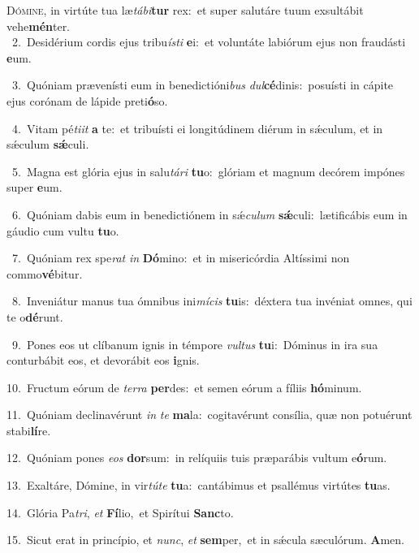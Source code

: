 \lettrine{\initial\textcolor{\initialcolor}{D}}{ómine,} in virtúte tua læ\-\textit{tá}\-\textit{bi}\textbf{tur} rex:~\star et super salutáre tuum exsultábit vehe\-\textbf{mén}\-ter.\\
{\numbfont\textcolor{\numbcolor}{~2.}}~Desidérium cordis ejus tribu\-\textit{ís}\-\textit{ti} \textbf{e}\-i:~\star et voluntáte labiórum ejus non fraudásti \textbf{e}\-um.\par
{\numbfont\textcolor{\numbcolor}{~3.}}~Quóniam prævenísti eum in benedictióni\textit{bus} \textit{dul}\-\textbf{cé}dinis:~\star posuísti in cápite ejus corónam de lápide preti\-\textbf{ó}\-so.\par
{\numbfont\textcolor{\numbcolor}{~4.}}~Vitam pé\-\textit{ti}\-\textit{it} \textbf{a} te:~\star et tribuísti ei longitúdinem diérum in sǽculum, et in sǽculum \textbf{sǽ}\-culi.\par
{\numbfont\textcolor{\numbcolor}{~5.}}~Magna est glória ejus in salu\-\textit{tá}\-\textit{ri} \textbf{tu}\-o:~\star glóriam et magnum decórem impónes super \textbf{e}\-um.\par
{\numbfont\textcolor{\numbcolor}{~6.}}~Quóniam dabis eum in benedictiónem in sǽ\-\textit{cu}\-\textit{lum} \textbf{sǽ}\-culi:~\star lætificábis eum in gáudio cum vultu \textbf{tu}\-o.\par
{\numbfont\textcolor{\numbcolor}{~7.}}~Quóniam rex spe\textit{rat} \textit{in} \textbf{Dó}\-mino:~\star et in misericórdia Altíssimi non commo\-\textbf{vé}\-bitur.\par
{\numbfont\textcolor{\numbcolor}{~8.}}~Inveniátur manus tua ómnibus ini\-\textit{mí}\-\textit{cis} \textbf{tu}\-is:~\star déxtera tua invéniat omnes, qui te o\-\textbf{dé}\-runt.\par
{\numbfont\textcolor{\numbcolor}{~9.}}~Pones eos ut clíbanum ignis in témpore \textit{vul}\-\textit{tus} \textbf{tu}\-i:~\star Dóminus in ira sua conturbábit eos, et devorábit eos \textbf{i}\-gnis.\par
{\numbfont\textcolor{\numbcolor}{10.}}~Fructum eórum de \textit{ter}\-\textit{ra} \textbf{per}\-des:~\star et semen eórum a fíliis \textbf{hó}\-minum.\par
{\numbfont\textcolor{\numbcolor}{11.}}~Quóniam declinavérunt \textit{in} \textit{te} \textbf{ma}\-la:~\star cogitavérunt consília, quæ non potuérunt stabi\-\textbf{lí}\-re.\par
{\numbfont\textcolor{\numbcolor}{12.}}~Quóniam pones \textit{e}\-\textit{os} \textbf{dor}\-sum:~\star in relíquiis tuis præparábis vultum e\-\textbf{ó}\-rum.\par
{\numbfont\textcolor{\numbcolor}{13.}}~Exaltáre, Dómine, in vir\-\textit{tú}\-\textit{te} \textbf{tu}\-a:~\star cantábimus et psallémus virtútes \textbf{tu}\-as.\par
{\numbfont\textcolor{\numbcolor}{14.}}~Glória Pa\-\textit{tri}\-, \textit{et} \textbf{Fí}\-lio,~\star et Spirítui \textbf{Sanc}\-to.\par
{\numbfont\textcolor{\numbcolor}{15.}}~Sicut erat in princípio, et \textit{nunc}\-, \textit{et} \textbf{sem}\-per,~\star et in sǽcula sæculórum. \textbf{A}\-men.\par
